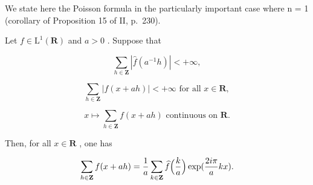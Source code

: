 
We state here the Poisson formula in the particularly important case where n = 1 (corollary of Proposition 15 of II, p.~230).

Let \(f\in \mathrm{L}^1 (\mathbf{R})\) and \(a > 0\) . Suppose that

\[
\sum_ {h \in \mathbf {Z}} | \widehat {f} (a ^ {- 1} h) | <   + \infty ,
\]

\[
\sum_ {h \in \mathbf {Z}} | f (x + a h) | <   + \infty \text {   for all   } x \in \mathbf {R},
\]

\[
x \mapsto \sum_ {h \in \mathbf {Z}} f (x + a h) \text {   continuous   on   } \mathbf {R}.
\]

Then, for all \(x \in \mathbf{R}\) , one has

\[
\sum_ {h \in {\bf Z}} f (x + a h) = \frac {1}{a} \sum_ {k \in {\bf Z}} \widehat {f} \Bigl (\frac {k}{a} \Bigr) \exp (\frac {2 i \pi}{a} k x).
\]

